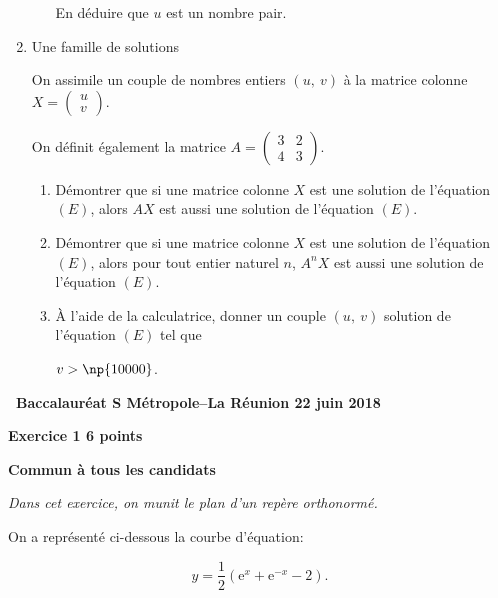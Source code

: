 \documentclass[10pt,a4paper]{article}
\begin{document}
\begin{enumerate}
\begin{enumerate}
En déduire que $u$ est un nombre pair.
	\end{enumerate}
\item  Une famille de solutions
	
On assimile un couple de nombres entiers $(u,~v)$ à la matrice colonne $X = \begin{pmatrix}u\\v\end{pmatrix}$.
	
On définit également la matrice $A = \begin{pmatrix}3&2\\4&3\end{pmatrix}$.
	\begin{enumerate}
		\item Démontrer que si une matrice colonne $X$ est une solution de l'équation $(E)$, alors $AX$ est aussi une solution de l'équation $(E)$.
		\item Démontrer que si une matrice colonne $X$ est une solution de l'équation $(E)$, alors pour tout entier naturel $n$,\: $A^n X$ est aussi une solution de l'équation $(E)$.
		\item À l'aide de la calculatrice, donner un couple $(u,~v)$ solution de l'équation $(E)$ tel que
		
 $v > \np{10000}$.
	\end{enumerate}
\end{enumerate}
\newpage
\hypertarget{Metropole}{}

\label{Metropole}
\renewcommand \footrulewidth{.2pt}
\pagestyle{fancy}
\thispagestyle{empty} 

\begin{center} 
{\Large{\textbf{\decofourleft~Baccalauréat S  Métropole--La Réunion  22 juin 2018~\decofourright
}}}
\end{center}

\bigskip
\textbf{Exercice 1 \hfill 6 points}

\textbf{Commun à tous les candidats }

\bigskip

\emph{Dans cet exercice, on munit le plan d'un repère orthonormé.}

On a représenté ci-dessous la courbe d'équation:

\[y = \dfrac{1}{2}\left(\text{e}^x + \text{e}^{-x} - 2\right).\]
\end{document}

